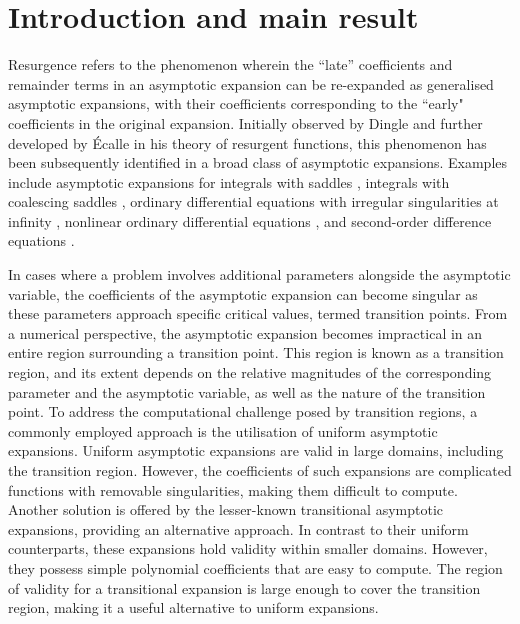 \documentclass[pdftex]{sigma}
\numberwithin{equation}{section}
\begin{document}
\renewcommand{\thefootnote}{\arabic{footnote}}
\setcounter{footnote}{0}

\section{Introduction and main result}

Resurgence refers to the phenomenon wherein the ``late'' coefficients and remainder terms in an asymptotic expansion can be re-expanded as generalised asymptotic expansions, with their coefficients corresponding to the ``early" coefficients in the original expansion. Initially observed by Dingle \cite{Dingle1973} and further developed by \'Ecalle \cite{Ecalle1981,Ecalle1981-II,Ecalle1981-III} in his theory of resurgent functions, this phenomenon has been subsequently identified in a broad class of asymptotic expansions. Examples include asymptotic expansions for integrals with saddles \cite{Bennett2018,Berry1991,Howls1997}, integrals with coalescing saddles \cite{OldeDaalhuis2000}, ordinary differential equations with irregular singularities at infinity \cite{Murphy1997, OldeDaalhuis1998b}, nonlinear ordinary differential equations \cite{OldeDaalhuis2005a,OldeDaalhuis2005b}, and second-order difference equations \cite{OldeDaalhuis2004}.

In cases where a problem involves additional parameters alongside the asymptotic variable, the coefficients of the asymptotic expansion can become singular as these parameters approach specific critical values, termed transition points. From a numerical perspective, the asymptotic expansion becomes impractical in an entire region surrounding a transition point. This region is known as a transition region, and its extent depends on the relative magnitudes of the corresponding parameter and the asymptotic variable, as well as the nature of the transition point. To address the computational challenge posed by transition regions, a commonly employed approach is the utilisation of uniform asymptotic expansions. Uniform asymptotic expansions are valid in large domains, including the transition region. However, the coefficients of such expansions are complicated functions with removable singularities, making them difficult to compute. Another solution is offered by the lesser-known transitional asymptotic expansions, providing an alternative approach. In contrast to their uniform counterparts, these expansions hold validity within smaller domains. However, they possess simple polynomial coefficients that are easy to compute. The region of validity for a transitional expansion is large enough to cover the transition region, making it a useful alternative to uniform expansions.
\end{document}
